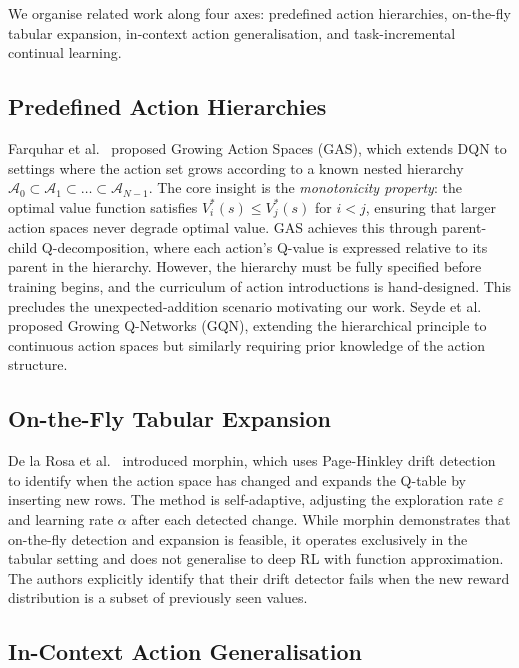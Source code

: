 \documentclass{article}
\begin{document}
We organise related work along four axes: predefined action hierarchies,
on-the-fly tabular expansion, in-context action generalisation, and
task-incremental continual learning.

\subsection{Predefined Action Hierarchies}

Farquhar et al.~\cite{farquhar2020growing} proposed Growing Action Spaces
(GAS), which extends DQN to settings where the action set grows according to a
known nested hierarchy $\mathcal{A}_0 \subset \mathcal{A}_1 \subset \dots
\subset \mathcal{A}_{N-1}$. The core insight is the \emph{monotonicity
property}: the optimal value function satisfies $V^*_i(s) \leq V^*_j(s)$ for
$i < j$, ensuring that larger action spaces never degrade optimal value. GAS
achieves this through parent-child Q-decomposition, where each action's
Q-value is expressed relative to its parent in the hierarchy. However, the
hierarchy must be fully specified before training begins, and the curriculum of
action introductions is hand-designed. This precludes the unexpected-addition
scenario motivating our work. Seyde et
al.~\cite{seyde2024growing} proposed Growing Q-Networks (GQN), extending the
hierarchical principle to continuous action spaces but similarly requiring
prior knowledge of the action structure.

\subsection{On-the-Fly Tabular Expansion}

De la Rosa et al.~\cite{delarosa2026morphin} introduced morphin, which uses
Page-Hinkley drift detection to identify when the action space has changed and
expands the Q-table by inserting new rows. The method is self-adaptive,
adjusting the exploration rate $\varepsilon$ and learning rate $\alpha$ after
each detected change. While morphin demonstrates that on-the-fly detection and
expansion is feasible, it operates exclusively in the tabular setting and does
not generalise to deep RL with function approximation. The authors explicitly
identify that their drift detector fails when the new reward distribution is a
subset of previously seen values.

\subsection{In-Context Action Generalisation}
\end{document}
